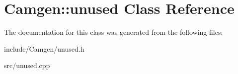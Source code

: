 \hypertarget{a00557}{\section{Camgen\-:\-:unused Class Reference}
\label{a00557}
}


The documentation for this class was generated from the following files\-:\begin{DoxyCompactItemize}
\item 
include/\-Camgen/unused.\-h\item 
src/unused.\-cpp\end{DoxyCompactItemize}
